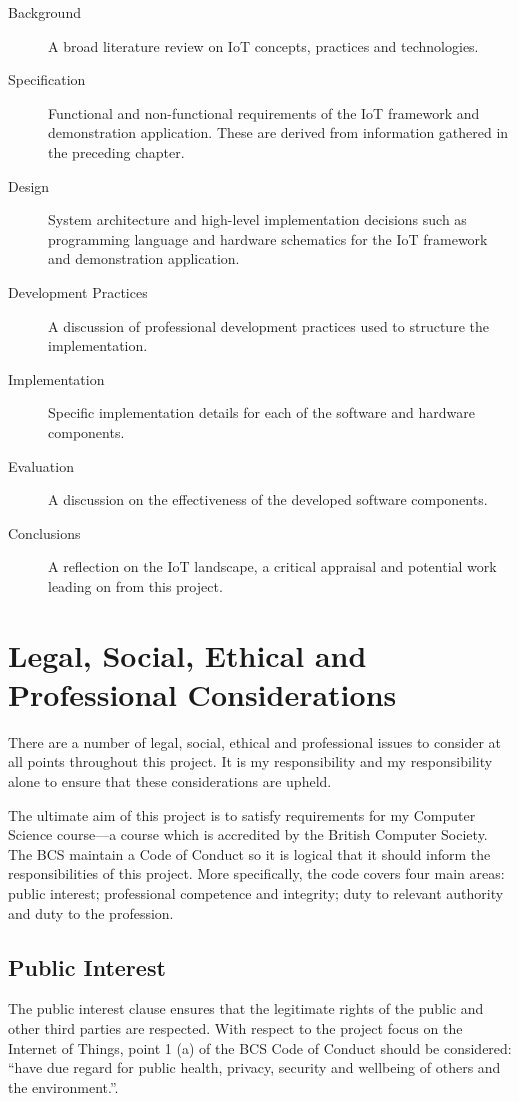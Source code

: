     \begin{description}
      \item[Background] A broad literature review on IoT concepts, practices and technologies.
      \item[Specification] Functional and non-functional requirements of the IoT framework and demonstration application. These are derived from information gathered in the preceding chapter.
      \item[Design] System architecture and high-level implementation decisions such as programming language and hardware schematics for the IoT framework and demonstration application.
      \item[Development Practices] A discussion of professional development practices used to structure the implementation.
      \item[Implementation] Specific implementation details for each of the software and hardware components.
      \item[Evaluation] A discussion on the effectiveness of the developed software components.
      \item[Conclusions] A reflection on the IoT landscape, a critical appraisal and potential work leading on from this project.

    \end{description}

  \section{Legal, Social, Ethical and Professional Considerations}
  \label{chapter:profession-considerations}
    There are a number of legal, social, ethical and professional issues to consider at all points throughout this project. It is my responsibility and my responsibility alone to ensure that these considerations are upheld.

    The ultimate aim of this project is to satisfy requirements for my Computer Science course---a course which is accredited by the British Computer Society. The BCS maintain a Code of Conduct \citep{bcs-coc} so it is logical that it should inform the responsibilities of this project. More specifically, the code covers four main areas: public interest; professional competence and integrity; duty to relevant authority and duty to the profession.

    \subsection{Public Interest}
      The public interest clause ensures that the legitimate rights of the public and other third parties are respected. With respect to the project focus on the Internet of Things, point 1 (a) of the BCS Code of Conduct should be considered: ``have due regard for public health, privacy, security and wellbeing of others and the environment.''.

